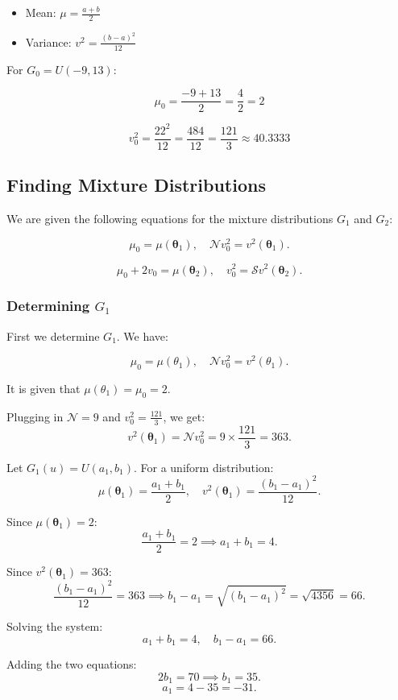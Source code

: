 \documentclass{article}
\begin{document}
\begin{itemize}
    \item Mean: \(\mu = \frac{a+b}{2}\)
    \item Variance: \(v^2 = \frac{(b-a)^2}{12}\)
\end{itemize}

For \(G_0 = U(-9, 13)\):

\[
\mu_0 = \frac{-9 + 13}{2} = \frac{4}{2} = 2
\]

\[
v_0^2 = \frac{22^2}{12} = \frac{484}{12} = \frac{121}{3} \approx 40.3333
\]

\subsection{Finding Mixture Distributions}

We are given the following equations for the mixture distributions \(G_1\) and \(G_2\):

\[
\mu_0 = \mu(\boldsymbol\theta_1), \quad \mathcal{N} v_0^2 = v^2(\boldsymbol\theta_1).
\]

\[
\mu_0 + 2v_0 = \mu(\boldsymbol\theta_2), \quad v_0^2 = \mathcal{S} v^2(\boldsymbol\theta_2).
\]

\subsubsection{Determining \(G_1\)}

First we determine \(G_1\). We have:

\[
\mu_0 = \mu(\theta_1), \quad \mathcal{N} v_0^2 = v^2(\theta_1).
\]

It is given that $\mu(\theta_1) = \mu_0 = 2$.

Plugging in \(\mathcal{N} = 9\) and \(v_0^2 = \frac{121}{3} \), we get:
\[
v^2(\boldsymbol\theta_1) = \mathcal{N} v_0^2 = 9 \times \frac{121}{3} = 363.
\]

Let \(G_1(u) = U(a_1, b_1)\). For a uniform distribution:
\[
\mu(\boldsymbol\theta_1) = \frac{a_1 + b_1}{2}, \quad v^2(\boldsymbol\theta_1) = \frac{(b_1 - a_1)^2}{12}.
\]

Since \(\mu(\boldsymbol\theta_1) = 2\):
\[
\frac{a_1 + b_1}{2} = 2 \implies a_1 + b_1 = 4.
\]

Since \(v^2(\boldsymbol\theta_1) = 363\):
\[
\frac{(b_1 - a_1)^2}{12} = 363 \implies b_1 - a_1 = \sqrt{(b_1 - a_1)^2} = \sqrt{4356} = 66.
\]

Solving the system:
\[
a_1 + b_1 = 4, \quad b_1 - a_1 = 66.
\]

Adding the two equations:
\[
2b_1 = 70 \implies b_1 = 35.
\]
\[
a_1 = 4 - 35 = -31.
\]
\end{document}
